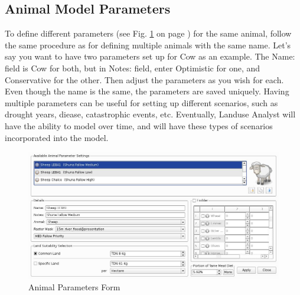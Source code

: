   \subsection{Animal Model Parameters}
To define different parameters (see Fig. \ref{fig:animalParameters} on page
\pageref{fig:animalParameters}) for the same animal, follow the same procedure
as for defining multiple animals with the same name. Let's say you want to have
two parameters set up for Cow as an example. The Name: field is Cow for both,
but in Notes: field, enter Optimistic for one, and Conservative for the other.
Then adjust the parameters as you wish for each. Even though the name is the
same, the parameters are saved uniquely. Having multiple parameters can be
useful for setting up different scenarios, such as drought years, diease,
catastrophic events, etc. Eventually, Landuse Analyst will have the ability to
model over time, and will have these types of scenarios incorporated into the
model.

\begin{figure}[ht]
    \includegraphics[scale=.23]{./images/animalParameters.jpg}
  \caption{\label{fig:animalParameters}Animal Parameters Form}
\end{figure}

